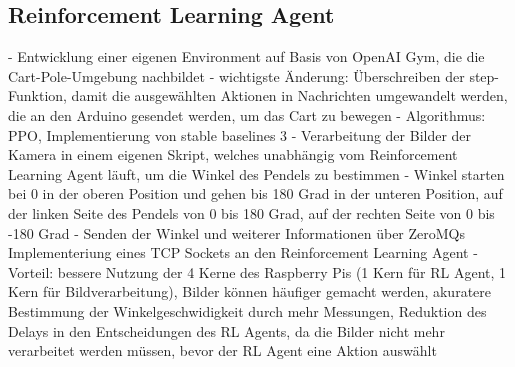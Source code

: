 \subsection{Reinforcement Learning Agent}
- Entwicklung einer eigenen Environment auf Basis von OpenAI Gym, die die Cart-Pole-Umgebung nachbildet
- wichtigste Änderung: Überschreiben der step-Funktion, damit die ausgewählten Aktionen in Nachrichten umgewandelt werden, die an den Arduino gesendet werden, um das Cart zu bewegen
- Algorithmus: PPO, Implementierung von stable baselines 3
- Verarbeitung der Bilder der Kamera in einem eigenen Skript, welches unabhängig vom Reinforcement Learning Agent läuft, um die Winkel des Pendels zu bestimmen
- Winkel starten bei 0 in der oberen Position und gehen bis 180 Grad in der unteren Position, auf der linken Seite des Pendels von 0 bis 180 Grad, auf der rechten Seite von 0 bis -180 Grad
- Senden der Winkel und weiterer Informationen über ZeroMQs Implementeriung eines TCP Sockets an den Reinforcement Learning Agent
- Vorteil: bessere Nutzung der 4 Kerne des Raspberry Pis (1 Kern für RL Agent, 1 Kern für Bildverarbeitung), Bilder können häufiger gemacht werden, akuratere Bestimmung der Winkelgeschwidigkeit durch mehr Messungen, Reduktion des Delays in den Entscheidungen des RL Agents, da die Bilder nicht mehr verarbeitet werden müssen, bevor der RL Agent eine Aktion auswählt

